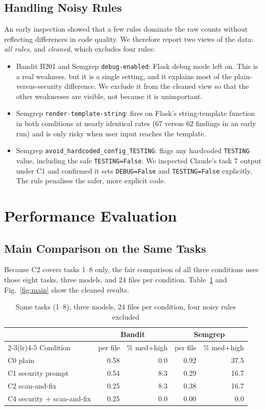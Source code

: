 \documentclass[conference]{IEEEtran}
\begin{document}
\subsection{Handling Noisy Rules}
An early inspection showed that a few rules dominate the raw counts without reflecting differences in code quality. We therefore report two views of the data: \emph{all rules}, and \emph{cleaned}, which excludes four rules:
\begin{itemize}
\item Bandit B201 and Semgrep \texttt{debug-enabled}: Flask debug mode left on. This is a real weakness, but it is a single setting, and it explains most of the plain-versus-security difference. We exclude it from the cleaned view so that the other weaknesses are visible, not because it is unimportant.
\item Semgrep \texttt{render-template-string}: fires on Flask's string-template function in both conditions at nearly identical rates (67 versus 62 findings in an early run) and is only risky when user input reaches the template.
\item Semgrep \texttt{avoid\_hardcoded\_config\_TESTING}: flags any hardcoded \texttt{TESTING} value, including the safe \texttt{TESTING=False}. We inspected Claude's task 7 output under C1 and confirmed it sets \texttt{DEBUG=False} and \texttt{TESTING=False} explicitly. The rule penalises the safer, more explicit code.
\end{itemize}

\section{Performance Evaluation}
\subsection{Main Comparison on the Same Tasks}
Because C2 covers tasks 1--8 only, the fair comparison of all three conditions uses those eight tasks, three models, and 24 files per condition. Table~\ref{tab:main} and Fig.~\ref{fig:main} show the cleaned results.

\begin{table}[t]
\caption{Same tasks (1--8), three models, 24 files per condition, four noisy rules excluded}
\label{tab:main}
\centering
\footnotesize
\begin{tabular}{@{}lrrrr@{}}
\toprule
 & \multicolumn{2}{c}{Bandit} & \multicolumn{2}{c}{Semgrep} \\
\cmidrule(lr){2-3}\cmidrule(lr){4-5}
Condition & per file & \% med+high & per file & \% med+high \\
\midrule
C0 plain & 0.58 & 0.0 & 0.92 & 37.5 \\
C1 security prompt & 0.54 & 8.3 & 0.29 & 16.7 \\
C2 scan-and-fix & 0.25 & 8.3 & 0.38 & 16.7 \\
C4 security + scan-and-fix & 0.25 & 0.0 & 0.00 & 0.0 \\
\bottomrule
\end{tabular}
\end{table}
\end{document}
